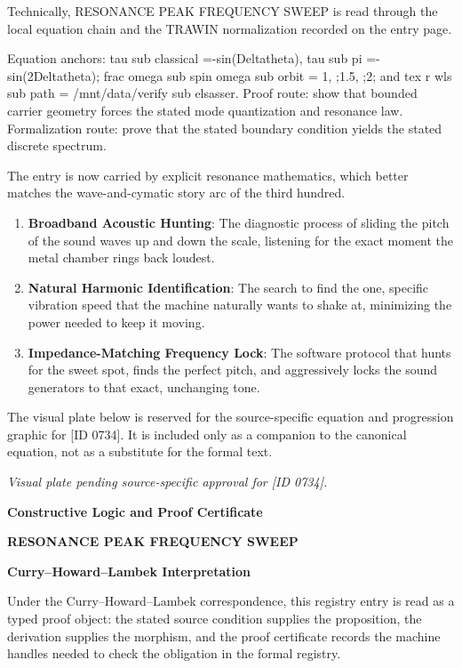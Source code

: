 Technically, RESONANCE PEAK FREQUENCY SWEEP is read through the local equation chain and the TRAWIN normalization recorded on the entry page.

Equation anchors: tau sub classical =-sin(Deltatheta), tau sub pi =-sin(2Deltatheta); frac omega sub spin omega sub orbit = 1, ;1.5, ;2; and tex r wls sub path = /mnt/data/verify sub elsasser. Proof route: show that bounded carrier geometry forces the stated mode quantization and resonance law. Formalization route: prove that the stated boundary condition yields the stated discrete spectrum.

The entry is now carried by explicit resonance mathematics, which better matches the wave-and-cymatic story arc of the third hundred.
\endgroup

\begin{enumerate}[leftmargin=1.6em,itemsep=6pt,topsep=4pt]
\item \textbf{Broadband Acoustic Hunting}: The diagnostic process of sliding the pitch of the sound waves up and down the scale, listening for the exact moment the metal chamber rings back loudest.
\item \textbf{Natural Harmonic Identification}: The search to find the one, specific vibration speed that the machine naturally wants to shake at, minimizing the power needed to keep it moving.
\item \textbf{Impedance-Matching Frequency Lock}: The software protocol that hunts for the sweet spot, finds the perfect pitch, and aggressively locks the sound generators to that exact, unchanging tone.
\end{enumerate}

\begingroup\footnotesize\sloppy
The visual plate below is reserved for the source-specific equation and progression graphic for [ID 0734]. It is included only as a companion to the canonical equation, not as a substitute for the formal text.
\par\endgroup
\begingroup\footnotesize\itshape
Visual plate pending source-specific approval for [ID 0734].
\par\endgroup

\clearpage
\begingroup\tzpsupportsetup
\noindent\textbf{\fontsize{10.8pt}{12.8pt}\selectfont [ID 0734] Constructive Logic and Proof Certificate}\par
\noindent\textbf{\fontsize{10pt}{12pt}\selectfont RESONANCE PEAK FREQUENCY SWEEP}\par
\vspace{0.45em}
\begingroup
\footnotesize
\setlength{\parskip}{0.22em}
\setlength{\parindent}{0pt}
\noindent\textbf{Curry--Howard--Lambek Interpretation}\par
Under the Curry--Howard--Lambek correspondence, this registry entry is read as a typed proof
object: the stated source condition supplies the proposition, the derivation supplies the
morphism, and the proof certificate records the machine handles needed to check the obligation
in the formal registry.

